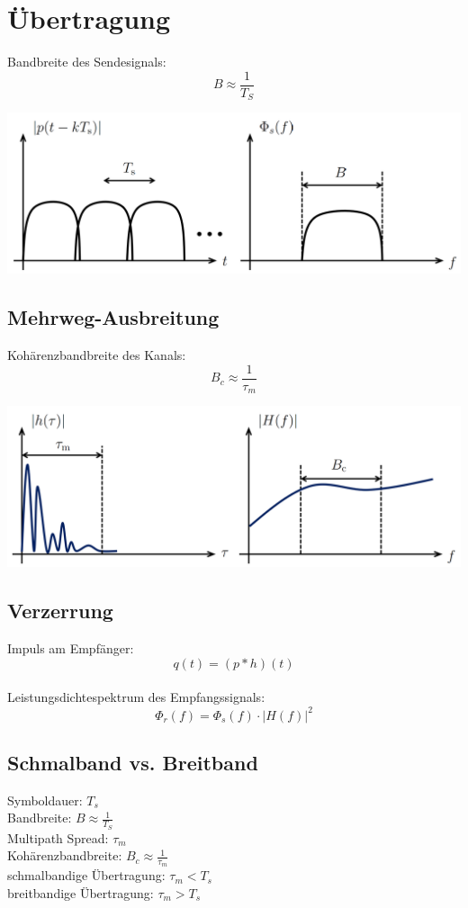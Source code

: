 \chapter{Übertragung}
Bandbreite des Sendesignals:
\[ B \approx \frac{1}{T_S} \]

\begin{center}
	\includegraphics[width=.9\textwidth]{./images/eintrager.png}
\end{center}

\section{Mehrweg-Ausbreitung}
Kohärenzbandbreite des Kanals:
\[ B_c \approx \frac{1}{\tau_m} \]

\begin{center}
	\includegraphics[width=.9\textwidth]{./images/mehrweg.png}
\end{center}

\section{Verzerrung}
Impuls am Empfänger:
\[ q(t) = (p * h)(t) \]
~\\
Leistungsdichtespektrum des Empfangssignals:
\[ \Phi_r(f) = \Phi_s(f) \cdot |H(f)|^2 \]

\section{Schmalband vs. Breitband}
Symboldauer: $T_s$\\
Bandbreite: $B \approx \frac{1}{T_S}$\\
Multipath Spread: $\tau_m$\\
Kohärenzbandbreite: $B_c \approx \frac{1}{\tau_m}$\\
schmalbandige Übertragung: $\tau_m < T_s$\\
breitbandige Übertragung: $\tau_m > T_s$

